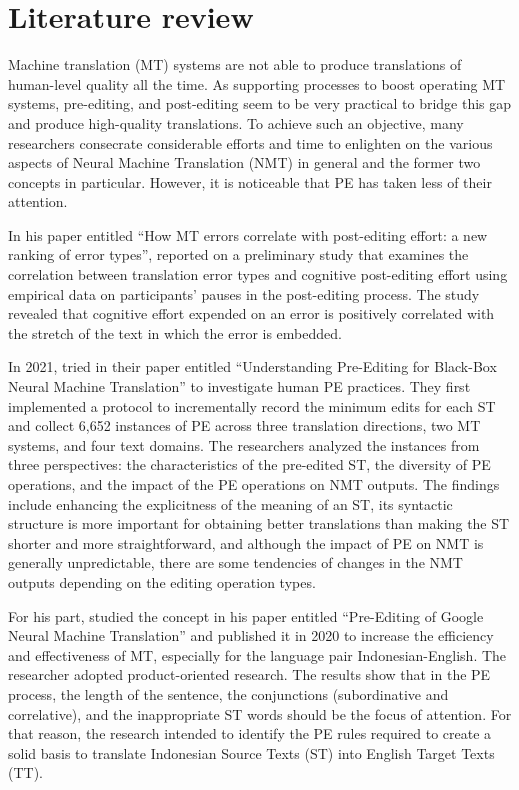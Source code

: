 \documentclass[english]{textolivre}
\begin{document}
\section{Literature review}

Machine translation (MT) systems are not able to produce translations of human-level quality all the time. As supporting processes to boost operating MT systems, pre-editing, and post-editing seem to be very practical to bridge this gap and produce high-quality translations. To achieve such an objective, many researchers consecrate considerable efforts and time to enlighten on the various aspects of Neural Machine Translation (NMT) in general and the former two concepts in particular. However, it is noticeable that PE has taken less of their attention.

In his paper entitled “How MT errors correlate with post-editing effort: a new ranking of error types”, \textcite{ke_hu_how_2020} reported on a preliminary study that examines the correlation between translation error types and cognitive post-editing effort using empirical data on participants' pauses in the post-editing process. The study revealed that cognitive effort expended on an error is positively correlated with the stretch of the text in which the error is embedded.

In 2021, \textcite{miyata_understanding_2021} tried in their paper entitled “Understanding Pre-Editing for Black-Box Neural Machine Translation” to investigate human PE practices. They first implemented a protocol to incrementally record the minimum edits for each ST and collect 6,652 instances of PE across three translation directions, two MT systems, and four text domains. The researchers analyzed the instances from three perspectives: the characteristics of the pre-edited ST, the diversity of PE operations, and the impact of the PE operations on NMT outputs. The findings include enhancing the explicitness of the meaning of an ST, its syntactic structure is more important for obtaining better translations than making the ST shorter and more straightforward, and although the impact of PE on NMT is generally unpredictable, there are some tendencies of changes in the NMT outputs depending on the editing operation types.

For his part, \textcite{taufik_pre-editing_2020} studied the concept in his paper entitled “Pre-Editing of Google Neural Machine Translation” and published it in 2020 to increase the efficiency and effectiveness of MT, especially for the language pair Indonesian-English. The researcher adopted product-oriented research. The results show that in the PE process, the length of the sentence, the conjunctions (subordinative and correlative), and the inappropriate ST words should be the focus of attention. For that reason, the research intended to identify the PE rules required to create a solid basis to translate Indonesian Source Texts (ST) into English Target Texts (TT).
\end{document}
